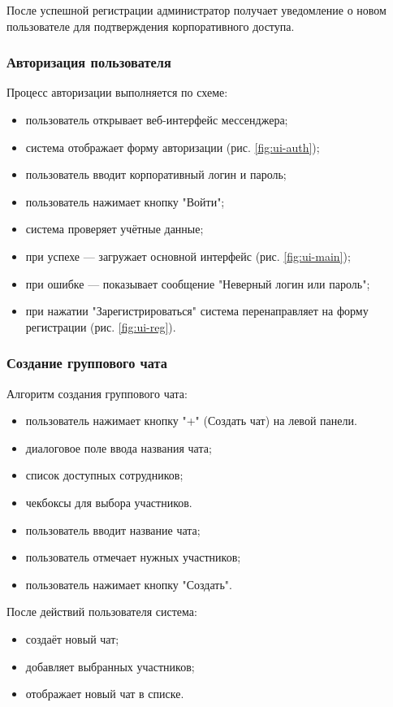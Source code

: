 После успешной регистрации администратор получает уведомление о новом пользователе для подтверждения корпоративного доступа. 

\subsubsection{Авторизация пользователя}  
Процесс авторизации выполняется по схеме:  
\begin{itemize}  
	\item пользователь открывает веб-интерфейс мессенджера;  
	\item система отображает форму авторизации (рис. \ref{fig:ui-auth});  
	\item пользователь вводит корпоративный логин и пароль;  
	\item пользователь нажимает кнопку "Войти";  
	\item система проверяет учётные данные;
		\item при успехе — загружает основной интерфейс (рис. \ref{fig:ui-main});  
		\item при ошибке — показывает сообщение "Неверный логин или пароль";   
	\item при нажатии "Зарегистрироваться" система перенаправляет на форму регистрации (рис. \ref{fig:ui-reg}).  
\end{itemize}  

\subsubsection{Создание группового чата}  
Алгоритм создания группового чата:  
\begin{itemize}  
	\item пользователь нажимает кнопку "+" (Создать чат) на левой панели.
	\item диалоговое поле ввода названия чата;  
	\item список доступных сотрудников;  
	\item чекбоксы для выбора участников.	
	\item пользователь вводит название чата;  
	\item пользователь отмечает нужных участников;  
	\item пользователь нажимает кнопку "Создать".
\end{itemize}

После действий пользователя система:

\begin{itemize}		
\item создаёт новый чат;  
\item добавляет выбранных участников;  
\item отображает новый чат в списке.  
\end{itemize} 

